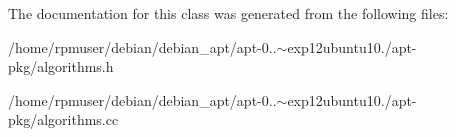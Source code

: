 \-The documentation for this class was generated from the following files\-:\begin{DoxyCompactItemize}
\item 
/home/rpmuser/debian/debian\-\_\-apt/apt-\/0..$\sim$exp12ubuntu10./apt-\/pkg/algorithms.\-h\item 
/home/rpmuser/debian/debian\-\_\-apt/apt-\/0..$\sim$exp12ubuntu10./apt-\/pkg/algorithms.\-cc\end{DoxyCompactItemize}
